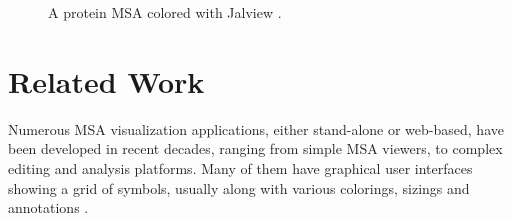 \begin{figure}[hbt]
\caption[Protein MSA Colored with Jalview]{A protein MSA colored with Jalview \cite{Waterhouse:2009fk,Procter2010aa}.}\label{fig:procter-2a}
\end{figure}

\section{Related Work}

Numerous MSA visualization applications, either stand-alone or web-based, have been developed in recent decades, ranging from simple MSA viewers, to complex editing and analysis platforms. Many of them have graphical user interfaces showing a grid of symbols, usually along with various colorings, sizings and annotations \cite{Procter2010aa}.

